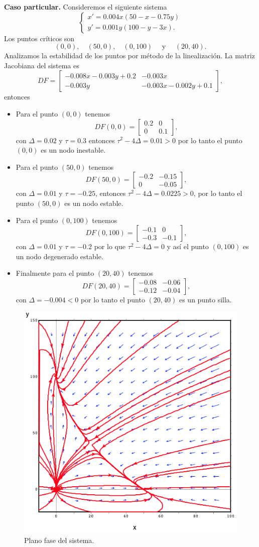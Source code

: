 \documentclass[11pt,letterpaper,draft]{report}
\newcommand\<{\langle}
\renewcommand\>{\rangle}
\begin{document}
\noindent \textbf{Caso particular.} Consideremos el siguiente sistema
\[
\begin{cases}
  x' = 0.004x(50 - x - 0.75y)\\
  y' = 0.001y(100 - y - 3x).
\end{cases}
\] Los puntos críticos son
\[
  (0,0), \quad (50,0), \quad (0,100) \quad \text{ y } \quad (20,40).
\] Analizamos la estabilidad de los puntos por método de la
linealización. La matriz Jacobiana del sistema es
\[
  DF = \begin{bmatrix}
    -0.008x - 0.003y + 0.2 & -0.003x\\
    -0.003y & -0.003x - 0.002y + 0.1
  \end{bmatrix},
\] entonces
\begin{itemize}
  \item Para el punto $(0,0)$ tenemos
    \[
      DF(0,0) = \begin{bmatrix}
        0.2 & 0\\
        0 & 0.1
      \end{bmatrix},
    \] con $\Delta = 0.02$ y $\tau = 0.3$ entonces
    $\tau^2 - 4\Delta = 0.01 > 0$ por lo tanto el punto $(0,0)$
    es un nodo inestable.
  \item Para el punto $(50,0)$ tenemos
    \[
      DF(50,0) = \begin{bmatrix}
        -0.2 & -0.15\\
        0 & -0.05
      \end{bmatrix},
    \] con $\Delta = 0.01$ y $\tau = -0.25$,
    entonces $\tau^2 - 4\Delta = 0.0225 > 0$, por lo tanto el
    punto $(50,0)$ es un nodo estable.
  \item Para el punto $(0,100)$ tenemos
    \[
      DF(0,100) = \begin{bmatrix}
        -0.1 & 0\\
        -0.3 & -0.1
      \end{bmatrix},
    \] con $\Delta = 0.01$ y $\tau = -0.2$ por lo que
    $\tau^2 - 4\Delta = 0$ y así el punto $(0,100)$ es
    un nodo degenerado estable.
  \item Finalmente para el punto $(20,40)$ tenemos
    \[
      DF(20,40) = \begin{bmatrix}
        -0.08 & -0.06\\
        -0.12 & -0.04
      \end{bmatrix},
    \] con $\Delta = -0.004 < 0$  por lo tanto el punto
    $(20,40)$ es un punto silla.
\end{itemize}

\begin{figure}[h]
  \centering
  \includegraphics[width=0.4\linewidth]{img/lotka-volterra-2.png}
  \caption{Plano fase del sistema.}%
  \label{fig:lotka-volterra-2}
\end{figure}
\end{document}
